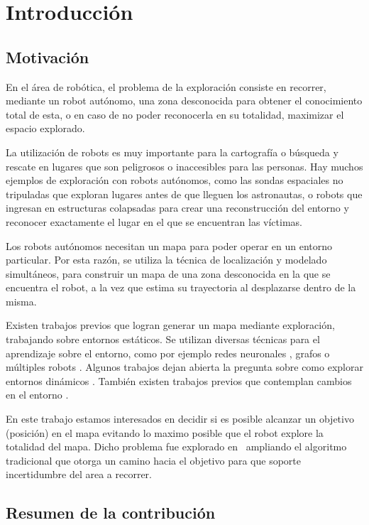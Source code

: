 \chapter{Introducción}

\section{Motivación}

En el área de robótica, el problema de la exploración consiste en recorrer, mediante un robot autónomo, una zona 
desconocida para obtener el conocimiento total de esta, o en caso de no poder reconocerla en su totalidad, maximizar 
el espacio explorado. 


La utilización de robots es muy importante para la cartografía o búsqueda y rescate en lugares que son peligrosos o 
inaccesibles para las personas. Hay muchos ejemplos de exploración con robots autónomos, como las sondas espaciales 
no tripuladas que exploran lugares antes de que lleguen los astronautas, o robots que ingresan en estructuras colapsadas 
para crear una reconstrucción del entorno y reconocer exactamente el lugar en el que se encuentran las víctimas.


Los robots autónomos necesitan un mapa para poder operar en un entorno particular. Por esta razón, se utiliza la técnica 
de localización y modelado simultáneos, para construir un mapa de una zona desconocida en la que se encuentra el robot, 
a la vez que estima su trayectoria al desplazarse dentro de la misma.


Existen trabajos previos que logran generar un mapa mediante exploración, trabajando sobre entornos estáticos. 
Se utilizan diversas técnicas para el aprendizaje sobre el entorno, como por ejemplo redes neuronales \cite{TP2}, 
grafos \cite{TP4} o múltiples robots \cite{TP5}. Algunos trabajos dejan abierta la pregunta sobre como explorar 
entornos dinámicos \cite{TP1} \cite{TP3}. También existen trabajos previos que contemplan cambios en el entorno \cite{TP6}.


En este trabajo estamos interesados en decidir si es posible alcanzar un 
objetivo (posición) en el mapa evitando lo maximo posible que el robot explore 
la totalidad del mapa. 
Dicho problema fue explorado 
en~\cite{melchior2007particle} ampliando el algoritmo tradicional que otorga 
un camino hacia el objetivo para que soporte incertidumbre del area a recorrer. 

\section{Resumen de la contribución}

